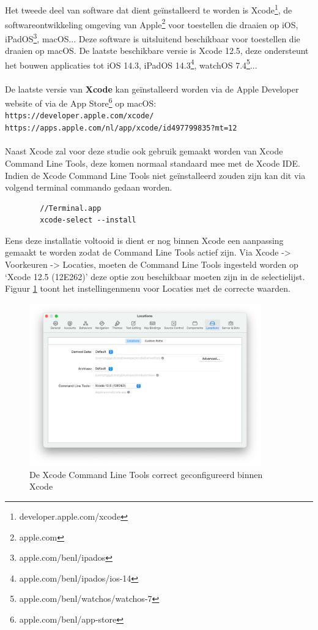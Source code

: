     \subsection{}
    \label{sec:I-Xcode}
    Het tweede deel van software dat dient geïnstalleerd te worden is Xcode\footnote{developer.apple.com/xcode}, de softwareontwikkeling omgeving van Apple\footnote{apple.com} voor toestellen die draaien op iOS, iPadOS\footnote{apple.com/benl/ipados}, macOS...  Deze software is uitsluitend beschikbaar voor toestellen die draaien op macOS. De laatste beschikbare versie is Xcode 12.5, deze ondersteunt het bouwen applicaties tot iOS 14.3, iPadOS 14.3\footnote{apple.com/benl/ipados/ios-14}, watchOS 7.4\footnote{apple.com/benl/watchos/watchos-7}... 
    \\ \\ 
    De laatste versie van \textbf{Xcode} kan geïnstalleerd worden via de Apple Developer website of via de App Store\footnote{apple.com/benl/app-store} op macOS: \\
    \verb*|https://developer.apple.com/xcode/|
    \\
    \verb*|https://apps.apple.com/nl/app/xcode/id497799835?mt=12|
    \\ \\ 
    Naast Xcode zal voor deze studie ook gebruik gemaakt worden van Xcode Command Line Tools, deze komen normaal standaard mee met de Xcode IDE. Indien de Xcode Command Line Tools niet geïnstalleerd zouden zijn kan dit via volgend terminal commando gedaan worden. \\
    \begin{lstlisting}
        //Terminal.app
        xcode-select --install
    \end{lstlisting}
    Eens deze installatie voltooid is dient er nog binnen Xcode een aanpassing gemaakt te worden zodat de Command Line Tools actief zijn. Via Xcode -> Voorkeuren -> Locaties, moeten de Command Line Tools ingesteld worden op `Xcode 12.5 (12E262)' deze optie zou beschikbaar moeten zijn in de selectielijst. Figuur \ref{fig:M-xcode-locations} toont het instellingenmenu voor Locaties met de correcte waarden. 
    \begin{figure}
        \centering
        \includegraphics[width=10cm]{img/xcode-locations}
        \caption{De Xcode Command Line Tools correct geconfigureerd binnen Xcode}
        \label{fig:M-xcode-locations}
    \end{figure}
    
